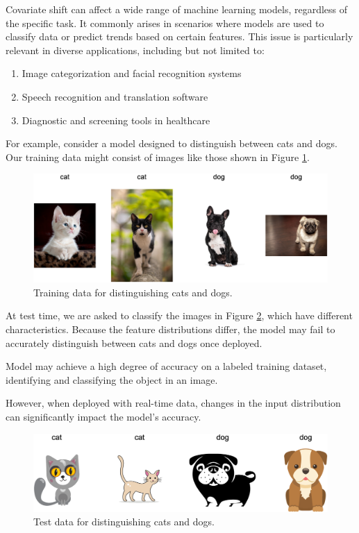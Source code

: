 Covariate shift can affect a wide range of machine learning models, regardless of the specific task. It commonly arises in scenarios where models are used to classify data or predict trends based on certain features. This issue is particularly relevant in diverse applications, including but not limited to:
	
	\begin{enumerate}
		\item Image categorization and facial recognition systems
		\item Speech recognition and translation software
		\item Diagnostic and screening tools in healthcare
	\end{enumerate}
	
For example, consider a model designed to distinguish between cats and dogs. Our training data might consist of images like those shown in Figure \ref{fig:cani-gatti-tr}.
	
	\begin{figure}[H]
		\centering
		\includegraphics[width=1\textwidth]{assets/cat-dog-train.png} 
		\caption{Training data for distinguishing cats and dogs.}
		\label{fig:cani-gatti-tr}
	\end{figure}
     
At test time, we are asked to classify the images in Figure \ref{fig:cani-gatti-ts}, which have different characteristics. Because the feature distributions differ, the model may fail to accurately distinguish between cats and dogs once deployed.

Model may achieve a high degree of accuracy on a labeled training dataset, identifying and classifying the object in an image. 

However, when deployed with real-time data, changes in the input distribution can significantly impact the model's accuracy.
		
	\begin{figure}[H]
		\centering
		\includegraphics[width=1\textwidth]{assets/cat-dog-test.png} 
		\caption{Test data for distinguishing cats and dogs.}
		\label{fig:cani-gatti-ts}
	\end{figure}	
	
